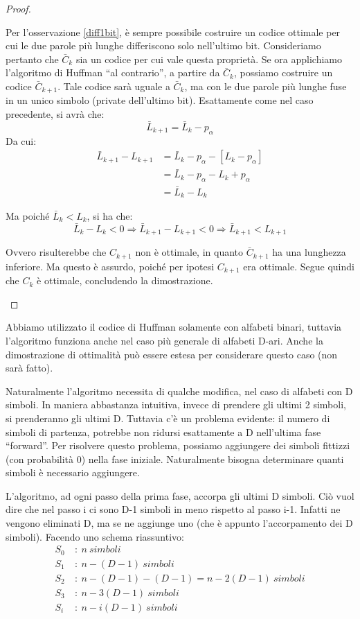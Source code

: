 \begin{teorema}
\begin{proof}
\begin{itemize}
Per l'osservazione \ref{diff1bit}, è sempre possibile costruire un codice ottimale per cui le due parole più 
lunghe differiscono solo nell'ultimo bit. Consideriamo pertanto che $\bar{C}_k$ sia un codice per cui vale questa proprietà.
Se ora applichiamo l'algoritmo di Huffman ``al contrario'', a partire da $\bar{C}_k$, possiamo costruire un codice 
$\bar{C}_{k+1}$. Tale codice sarà uguale a $\bar{C}_k$, ma con le due parole più lunghe fuse in un unico simbolo 
(private dell'ultimo bit).
Esattamente come nel caso precedente, si avrà che:
\[
 \bar{L}_{k+1}=\bar{L}_{k}-p_{\alpha}
\]
Da cui:
\[\begin{split}
 \bar{L}_{k+1} - L_{k+1}&=\bar{L}_{k}-p_{\alpha} - [L_k-p_{\alpha}] \\
  &=\bar{L}_{k}-p_{\alpha} - L_k+p_{\alpha} \\
  &=\bar{L}_{k}-L_k
 \end{split}
\]

Ma poiché $\bar{L}_k < L_k$, si ha che:
\[
 \bar{L}_k-L_k<0 \Rightarrow \bar{L}_{k+1}-L_{k+1}<0 \Rightarrow \bar{L}_{k+1}<L_{k+1}
\]

Ovvero risulterebbe che $C_{k+1}$ non è ottimale, in quanto $\bar{C}_{k+1}$ ha una lunghezza inferiore.
Ma questo è assurdo, poiché per ipotesi $C_{k+1}$ era ottimale.
Segue quindi che $C_{k}$ è ottimale, concludendo la dimostrazione.

\end{itemize}
\end{proof}
\end{teorema}

Abbiamo utilizzato il codice di Huffman solamente con alfabeti binari, tuttavia l'algoritmo 
funziona anche nel caso più generale di alfabeti D-ari. Anche la dimostrazione di ottimalità può essere estesa 
per considerare questo caso (non sarà fatto).

Naturalmente l'algoritmo necessita di qualche modifica, nel caso di alfabeti con D simboli. In maniera abbastanza intuitiva, invece di prendere gli ultimi 2 simboli, si prenderanno gli ultimi D.
Tuttavia c'è un problema evidente: il numero di simboli di partenza, potrebbe non ridursi esattamente a D nell'ultima fase ``forward''.
Per risolvere questo problema, possiamo aggiungere dei simboli fittizzi (con probabilità 0) nella fase iniziale.
Naturalmente bisogna determinare quanti simboli è necessario aggiungere.

L'algoritmo, ad ogni passo della prima fase, accorpa gli ultimi D simboli. Ciò vuol dire che nel passo i ci sono D-1 simboli in meno rispetto al passo i-1. Infatti ne vengono eliminati D, ma se ne aggiunge uno (che è appunto l'accorpamento dei D simboli).
Facendo uno schema riassuntivo:
\[\begin{split}
 S_0 \ &: \ n \ simboli  \\
 S_1 \ &: \ n-(D-1) \ simboli \\
 S_2 \ &: \ n-(D-1)-(D-1)=n-2(D-1) \ simboli \\
 S_3 \ &: \ n-3(D-1) \ simboli \\
 S_i \ &: \ n-i(D-1) \ simboli
   \end{split}
\]

